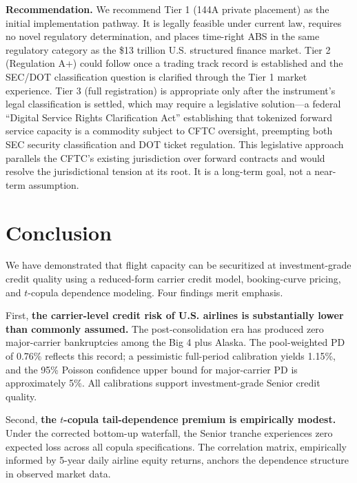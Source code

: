 \documentclass[12pt,a4paper]{article}
\begin{document}
\textbf{Recommendation.} We recommend Tier 1 (144A private placement) as the initial implementation pathway. It is legally feasible under current law, requires no novel regulatory determination, and places time-right ABS in the same regulatory category as the \$13 trillion U.S. structured finance market. Tier 2 (Regulation A+) could follow once a trading track record is established and the SEC/DOT classification question is clarified through the Tier 1 market experience. Tier 3 (full registration) is appropriate only after the instrument's legal classification is settled, which may require a legislative solution---a federal ``Digital Service Rights Clarification Act'' establishing that tokenized forward service capacity is a commodity subject to CFTC oversight, preempting both SEC security classification and DOT ticket regulation. This legislative approach parallels the CFTC's existing jurisdiction over forward contracts and would resolve the jurisdictional tension at its root. It is a long-term goal, not a near-term assumption.

\section{Conclusion}

We have demonstrated that flight capacity can be securitized at investment-grade credit quality using a reduced-form carrier credit model, booking-curve pricing, and $t$-copula dependence modeling. Four findings merit emphasis.

First, \textbf{the carrier-level credit risk of U.S. airlines is substantially lower than commonly assumed.} The post-consolidation era has produced zero major-carrier bankruptcies among the Big 4 plus Alaska. The pool-weighted PD of 0.76\% reflects this record; a pessimistic full-period calibration yields 1.15\%, and the 95\% Poisson confidence upper bound for major-carrier PD is approximately 5\%. All calibrations support investment-grade Senior credit quality.

Second, \textbf{the $t$-copula tail-dependence premium is empirically modest.} Under the corrected bottom-up waterfall, the Senior tranche experiences zero expected loss across all copula specifications. The correlation matrix, empirically informed by 5-year daily airline equity returns, anchors the dependence structure in observed market data.
\end{document}
